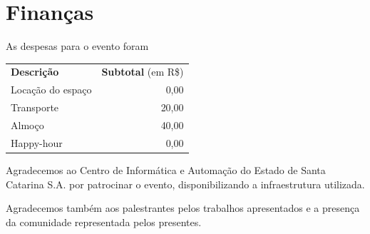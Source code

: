 \documentclass[12pt]{article}
\begin{document}
\newpage

\section*{Finanças}

As despesas para o evento foram

\begin{tabular}{p{}r}
  \textbf{Descrição} & \textbf{Subtotal} (em R\$) \\
  Locação do espaço & 0,00 \\
  Transporte & 20,00 \\ %
  Almoço & 40,00 \\ %
  Happy-hour & 0,00 \\ %
\end{tabular}


Agradecemos ao Centro de Informática e Automação do Estado de Santa Catarina
S.A. por patrocinar o evento, disponibilizando a infraestrutura utilizada.

Agradecemos também aos palestrantes pelos trabalhos apresentados e a presença da comunidade representada pelos presentes.

%
\end{document}
